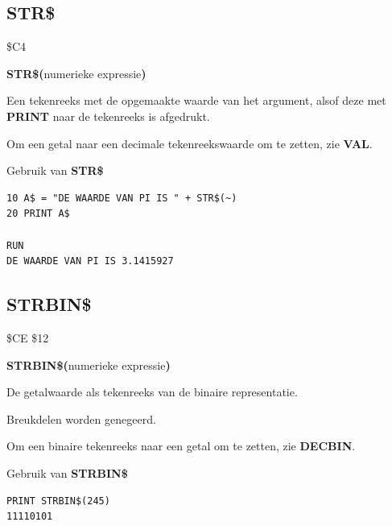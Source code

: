 \subsection{STR\$}
\begin{description}[leftmargin=2cm,style=nextline]
\item [Token:]    \$C4

\item [Formaat:]   {\bf STR\$(}numerieke expressie{\bf)}

\item [Retourneert:]  Een tekenreeks met de opgemaakte waarde van het argument, alsof deze met {\bf PRINT} naar de tekenreeks is afgedrukt.

\item [Opmerkingen:]  Om een getal naar een decimale tekenreekswaarde om te zetten, zie {\bf VAL}.

\item [Voorbeeld:]  Gebruik van {\bf STR\$}

\begin{tcolorbox}[colback=black,coltext=white]
\verbatimfont{\codefont}
\begin{verbatim}
10 A$ = "DE WAARDE VAN PI IS " + STR$(~)
20 PRINT A$

RUN
DE WAARDE VAN PI IS 3.1415927
\end{verbatim}
\end{tcolorbox}
\end{description}


\newpage
\subsection{STRBIN\$}
\begin{description}[leftmargin=2cm,style=nextline]
\item [Token:]    \$CE \$12

\item [Formaat:]   {\bf STRBIN\$(}numerieke expressie{\bf)}

\item [Retourneert:]  De getalwaarde als tekenreeks van de binaire representatie.

\item [Opmerkingen:]  Breukdelen worden genegeerd.

                  Om een binaire tekenreeks naar een getal om te zetten, zie {\bf DECBIN}.

\item [Voorbeeld:]  Gebruik van {\bf STRBIN\$}

\begin{tcolorbox}[colback=black,coltext=white]
\verbatimfont{\codefont}
\begin{verbatim}
PRINT STRBIN$(245)
11110101
\end{verbatim}
\end{tcolorbox}
\end{description}

